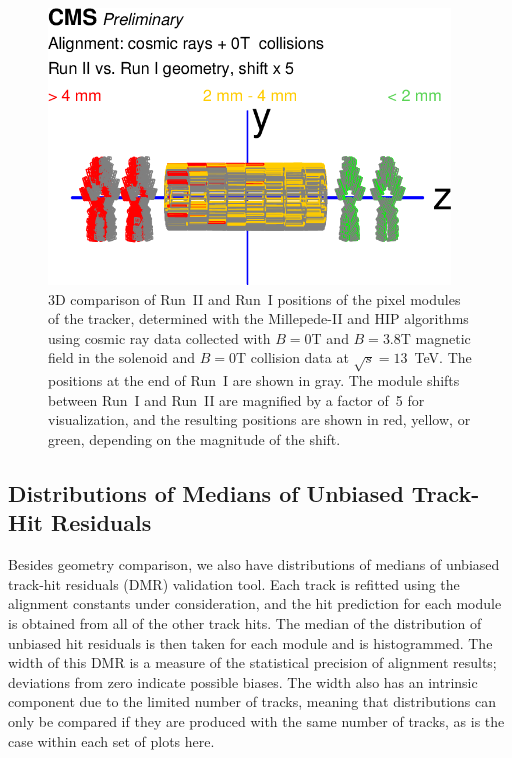 \begin{figure}[htb]
    \begin{center}
        \includegraphics[width=0.95\textwidth]{../figs/Alignment/AlRes_RunIIvsRunI.png}
    \end{center}
    \caption{3D comparison of Run~II and Run~I positions of the pixel modules of the tracker, determined with the Millepede-II and HIP algorithms using cosmic ray data collected with $B=0$T and $B=3.8$T magnetic field in the solenoid and $B=0$T collision data at $\sqrt{s}=13$~TeV. The positions at the end of Run~I are shown in gray. The module shifts between Run~I and Run~II are magnified by a factor of~5 for visualization, and the resulting positions are shown in red, yellow, or green, depending on the magnitude of the shift. }
    \label{fig:GCP_3D}
\end{figure}

\subsection{Distributions of Medians of Unbiased Track-Hit Residuals}
\label{sec:AlRes_DMRs}

Besides geometry comparison, we also have distributions of medians of unbiased track-hit residuals (DMR) validation tool. Each track is refitted using the alignment constants under consideration, and the hit prediction for each module is obtained from all of the other track hits. The median of the distribution of unbiased hit residuals is then taken for each module and is histogrammed. The width of this DMR is a measure of the statistical precision of alignment results; deviations from zero indicate possible biases. The width also has an intrinsic component due to the limited number of tracks, meaning that distributions can only be compared if they are produced with the same number of tracks, as is the case within each set of plots here. 

